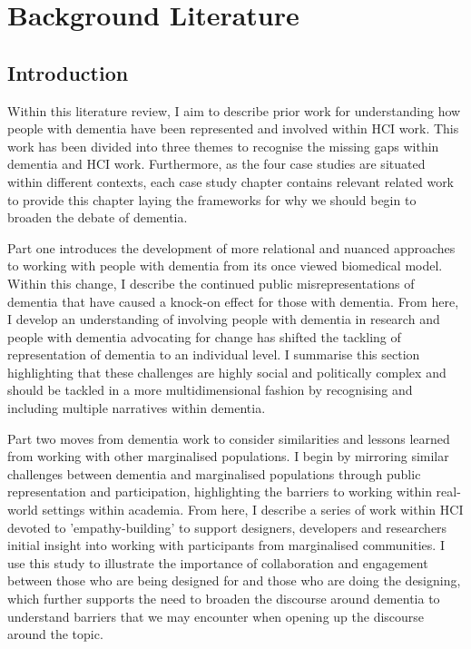 \chapter{Background Literature}
\label{BackgroundLit}

\section{Introduction}
\label{BL:Intro}
Within this literature review, I aim to describe prior work for understanding how people with dementia have been represented and involved within HCI work. This work has been divided into three themes to recognise the missing gaps within dementia and HCI work. Furthermore, as the four case studies are situated within different contexts, each case study chapter contains relevant related work to provide this chapter laying the frameworks for why we should begin to broaden the debate of dementia. 

Part one introduces the development of more relational and nuanced approaches to working with people with dementia from its once viewed biomedical model. Within this change, I describe the continued public misrepresentations of dementia that have caused a knock-on effect for those with dementia. From here, I develop an understanding of involving people with dementia in research and people with dementia advocating for change has shifted the tackling of representation of dementia to an individual level. I summarise this section highlighting that these challenges are highly social and politically complex and should be tackled in a more multidimensional fashion by recognising and including multiple narratives within dementia.

Part two moves from dementia work to consider similarities and lessons learned from working with other marginalised populations. I begin by mirroring similar challenges between dementia and marginalised populations through public representation and participation, highlighting the barriers to working within real-world settings within academia. From here, I describe a series of work within HCI devoted to 'empathy-building' to support designers, developers and researchers initial insight into working with participants from marginalised communities. I use this study to illustrate the importance of collaboration and engagement between those who are being designed for and those who are doing the designing, which further supports the need to broaden the discourse around dementia to understand barriers that we may encounter when opening up the discourse around the topic.

